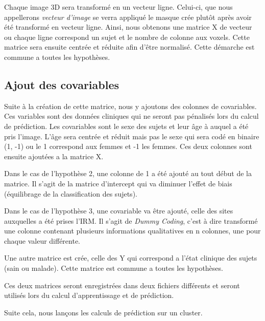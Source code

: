 Chaque image 3D sera transformé en un vecteur ligne. Celui-ci, que nous appellerons \textit{vecteur d'image} se verra appliqué le masque crée plutôt après avoir été transformé en vecteur ligne. Ainsi, nous obtenons une matrice X de vecteur ou chaque ligne correspond un sujet et le nombre de colonne aux voxels.
Cette matrice sera ensuite centrée et réduite afin d'être normalisé. 
Cette démarche est commune a toutes les hypothèses. 

\subsection{Ajout des covariables}

Suite à la création de cette matrice, nous y ajoutons des colonnes de covariables. Ces variables sont des données cliniques qui ne seront pas pénalisés lors du calcul de prédiction. Les covariables sont le sexe des sujets et leur âge à auquel a été pris l'image. 
L'âge sera centrée et réduit mais pas le sexe qui sera codé en binaire (1, -1) ou le 1 correspond aux femmes et -1 les femmes. 
Ces deux colonnes sont ensuite ajoutées a la matrice X. 

Dans le cas de l'hypothèse 2, une colonne de 1 a été ajouté au tout début de la matrice.
Il s'agit de la matrice d'intercept qui va diminuer l'effet de biais (équilibrage de la classification des sujets).

Dans le cas de l'hypothèse 3, une covariable va être ajouté, celle des sites auxquelles a été prises l'IRM. Il s'agit de \textit{Dummy Coding}, c'est à dire transformé une colonne contenant plusieurs informations qualitatives en n colonnes, une pour chaque valeur différente. 

Une autre matrice est crée, celle des Y qui correspond a l'état clinique des sujets (sain ou malade). Cette matrice est commune a toutes les hypothèses. 

Ces deux matrices seront enregistrées dans deux fichiers différents et seront utilisés lors du calcul d'apprentissage et de prédiction.


Suite cela, nous lançons les calculs de prédiction sur un cluster. 


